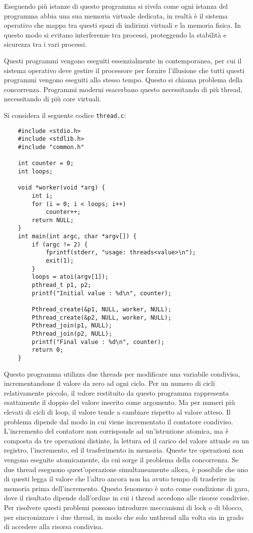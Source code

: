 \documentclass{article}
\numberwithin{equation}{subsection}
\begin{document}
Eseguendo più istanze di questo programma si rivela come ogni istanza del programma abbia una sua memoria virtuale dedicata, in realtà è il sistema operativo che mappa 
tra questi spazi di indirizzi virtuali e la memoria fisica. In questo modo si evitano interferenze tra processi, proteggendo la stabilità e sicurezza tra i vari processi. 


Questi programmi vengono eseguiti essenzialmente in contemporanea, per cui il sistema operativo deve gestire il processore per fornire l'illusione 
che tutti questi programmi vengono eseguiti allo stesso tempo. Questo si chiama problema della concorrenza. 
Programmi moderni esacerbano questo necessitando di più thread, necessitando di più core virtuali. 

Si considera il seguente codice \verb|thread.c|:
\begin{verbatim}
	#include <stdio.h>
	#include <stdlib.h>
	#include "common.h"

	int counter = 0;
	int loops;

	void *worker(void *arg) {
		int i;
		for (i = 0; i < loops; i++) 
			counter++;
		return NULL;
	}
	int main(int argc, char *argv[]) {
        if (argc != 2) {
            fprintf(stderr, "usage: threads<value>\n");
            exit(1);
        }
        loops = atoi(argv[1]);
        pthread_t p1, p2;
        printf("Initial value : %d\n", counter);

        Pthread_create(&p1, NULL, worker, NULL);
        Pthread_create(&p2, NULL, worker, NULL);
        Pthread_join(p1, NULL);
        Pthread_join(p2, NULL);
        printf("Final value : %d\n", counter);
        return 0;
	}
\end{verbatim}

Questo programma utilizza due threads per modificare una variabile condivisa, incrementandone il valore da zero ad ogni ciclo. 
Per un numero di cicli relativamente piccolo, il valore restituito da questo programma rappresenta esattamente il doppio del valore inserito 
come argomento. Ma per numeri più elevati di cicli di loop, il valore tende a cambiare rispetto al valore atteso. 
Il problema dipende dal modo in cui viene incrementato il contatore condiviso. L'incremento del contatore non corrisponde ad un'istruzione 
atomica, ma è composta da tre operazioni distinte, la lettura ed il carico del valore attuale su un registro, l'incremento, ed il trasferimento in 
memoria. Queste tre operazioni non vengono eseguite atomicamente, da cui sorge il problema della concorrenza. Se due thread eseguono quest'operazione 
simultaneamente allora, è possibile che uno di questi legga il valore che l'altro ancora non ha avuto tempo di trasferire in memoria prima dell'incremento. 
Questo fenomeno è noto come condizione di gara, dove il risultato dipende dall'ordine in cui i thread accedono alle risorse condivise. Per risolvere questi problemi 
possono introdurre meccanismi di lock o di blocco, per sincronizzare i due thread, in modo che solo unthread alla volta sia in grado di accedere alla risorsa condivisa. 
\end{document}
